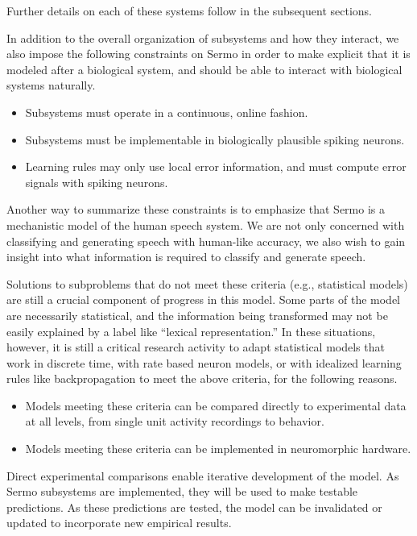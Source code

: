 Further details on each of these
systems follow in the subsequent sections.

In addition to the overall organization
of subsystems and how they interact,
we also impose the following constraints
on Sermo in order to make explicit
that it is modeled after a biological system,
and should be able to interact
with biological systems naturally.

\begin{itemize}
  \item Subsystems must operate in a continuous, online fashion.
  \item Subsystems must be implementable in biologically plausible
    spiking neurons.
  \item Learning rules may only use local error information,
    and must compute error signals with spiking neurons.
\end{itemize}

Another way to summarize these constraints
is to emphasize that Sermo
is a mechanistic model
of the human speech system.
We are not only concerned with
classifying and generating speech
with human-like accuracy,
we also wish to gain insight
into what information is required
to classify and generate speech.

Solutions to subproblems that do not
meet these criteria
(e.g., statistical models)
are still a crucial component
of progress in this model.
Some parts of the model are
necessarily statistical,
and the information being transformed
may not be easily explained
by a label like ``lexical representation.''
In these situations,
however, it is still a critical research activity
to adapt statistical models that work in
discrete time, with rate based neuron models,
or with idealized learning rules like backpropagation
to meet the above criteria,
for the following reasons.

\begin{itemize}
  \item Models meeting these criteria can be compared directly
    to experimental data at all levels,
    from single unit activity recordings to behavior.
  \item Models meeting these criteria can be implemented
    in neuromorphic hardware.
\end{itemize}

Direct experimental comparisons enable
iterative development of the model.
As Sermo subsystems are implemented,
they will be used to make testable predictions.
As these predictions are tested,
the model can be invalidated
or updated to incorporate new empirical results.


